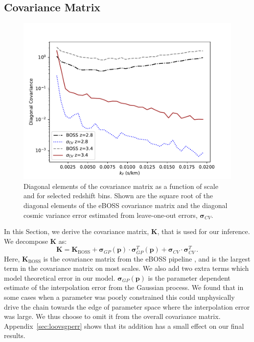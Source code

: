
\subsection{Covariance Matrix}
\label{sec:theoryerror}

\begin{figure}
    \centering
    \includegraphics[width=\textwidth]{figures/errors_loo.pdf}
    \caption{\label{fig:covariance_loo}
    Diagonal elements of the covariance matrix as a function of scale and for selected redshift bins.
    Shown are the square root of the diagonal elements of the eBOSS covariance matrix and the diagonal cosmic variance error estimated from leave-one-out errors, $\boldsymbol{\sigma}_{CV}$.}
\end{figure}

In this Section, we derive the covariance matrix, $\boldsymbol{K}$, that is used for our inference.
We decompose $\boldsymbol{K}$ as:
\begin{equation}
    \boldsymbol{K} = \boldsymbol{K}_\mathrm{BOSS} + \boldsymbol{\sigma}_{GP}(\boldsymbol{p}) \cdot \boldsymbol{\sigma}_{GP}^T (\boldsymbol{p}) + \boldsymbol{\sigma}_{CV} \cdot \boldsymbol{\sigma}_{CV}^T \,.
    \label{eq:covariance}
\end{equation}
Here, $\boldsymbol{K}_\mathrm{BOSS}$ is the covariance matrix from the eBOSS pipeline \cite{2019JCAP...07..017C}, and is the largest term in the covariance matrix on most scales.
We also add two extra terms which model theoretical error in our model.
$\boldsymbol{\sigma}_{GP}(\boldsymbol{p})$ is the parameter dependent estimate of the interpolation error from the Gaussian process.
We found that in some cases when a parameter was poorly constrained this could unphysically drive the chain towards the edge of parameter space where the interpolation error was large.
We thus choose to omit it from the overall covariance matrix.
Appendix~\ref{sec:loovsgperr} shows that its addition has a small effect on our final results.

